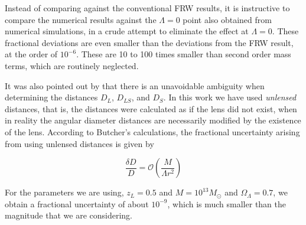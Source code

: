 Instead of comparing against the conventional FRW results, it is instructive to compare the numerical results against the $\Lambda = 0$ point also obtained from numerical simulations, in a crude attempt to eliminate the effect at $\Lambda = 0$. These fractional deviations are even smaller than the deviations from the FRW result, at the order of $10^{-6}$. These are 10 to 100 times smaller than second order mass terms, which are routinely neglected. 

It was also pointed out by \citet{butcher2016no} that there is an unavoidable ambiguity when determining the distances $D_L$, $D_{LS}$, and $D_S$. In this work we have used \emph{unlensed} distances, that is, the distances were calculated as if the lens did not exist, when in reality the angular diameter distances are necessarily modified by the existence of the lens. According to Butcher's calculations, the fractional uncertainty arising from using unlensed distances is given by

\begin{equation}
  \frac{\delta D}{D} = \mathcal{O}\left (\frac{M}{\Lambda r^2} \right )
\end{equation}

For the parameters we are using, $z_L = 0.5$ and $M = 10^{13} M_{\odot}$ and $\Omega_{\Lambda} = 0.7$, we obtain a fractional uncertainty of about $10^{-9}$, which is much smaller than the magnitude that we are considering. 

